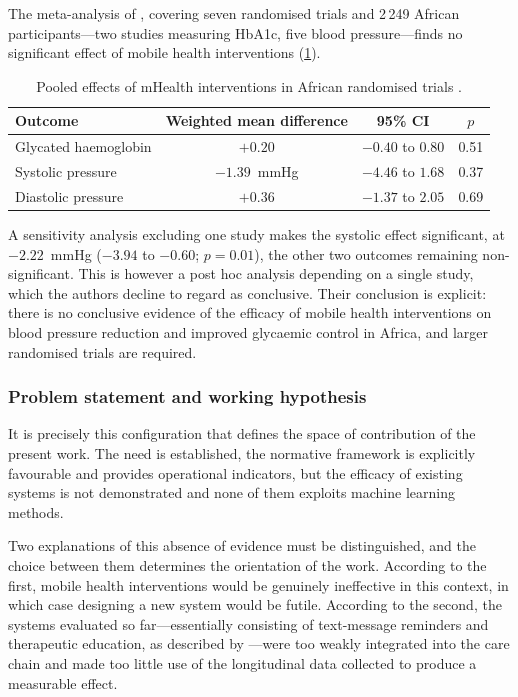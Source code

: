 \documentclass[12pt,a4paper,oneside]{report}
\begin{document}
The meta-analysis of \textcite{aovare2023}, covering seven randomised trials and 2\,249 African participants---two studies measuring HbA1c, five blood pressure---finds no significant effect of mobile health interventions (\cref{tab:aovare}).

\begin{table}[htbp]
\centering\small
\caption{Pooled effects of mHealth interventions in African randomised trials \parencite{aovare2023}.}\label{tab:aovare}
\begin{tabular}{@{}lccc@{}}
\toprule
\textbf{Outcome} & \textbf{Weighted mean difference} & \textbf{95\% CI} & \textbf{$p$} \\
\midrule
Glycated haemoglobin & $+0.20$ & $-0.40$ to $0.80$ & 0.51 \\
Systolic pressure & $-1.39$~mmHg & $-4.46$ to $1.68$ & 0.37 \\
Diastolic pressure & $+0.36$ & $-1.37$ to $2.05$ & 0.69 \\
\bottomrule
\end{tabular}
\end{table}

A sensitivity analysis excluding one study makes the systolic effect significant, at $-2.22$~mmHg ($-3.94$ to $-0.60$; $p=0.01$), the other two outcomes remaining non-significant. This is however a post hoc analysis depending on a single study, which the authors decline to regard as conclusive. Their conclusion is explicit: there is no conclusive evidence of the efficacy of mobile health interventions on blood pressure reduction and improved glycaemic control in Africa, and larger randomised trials are required.

\subsubsection{Problem statement and working hypothesis}

It is precisely this configuration that defines the space of contribution of the present work. The need is established, the normative framework is explicitly favourable and provides operational indicators, but the efficacy of existing systems is not demonstrated and none of them exploits machine learning methods.

Two explanations of this absence of evidence must be distinguished, and the choice between them determines the orientation of the work. According to the first, mobile health interventions would be genuinely ineffective in this context, in which case designing a new system would be futile. According to the second, the systems evaluated so far---essentially consisting of text-message reminders and therapeutic education, as described by \textcite{stokes2022}---were too weakly integrated into the care chain and made too little use of the longitudinal data collected to produce a measurable effect.
\end{document}
